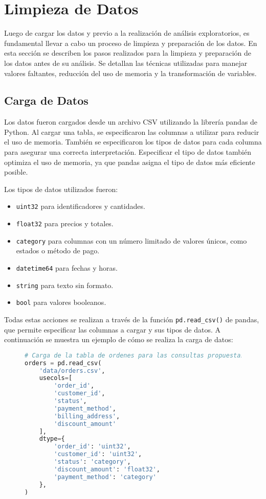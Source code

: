 \section{Limpieza de Datos}
\label{sec:limpieza_de_datos}

Luego de cargar los datos y previo a la realización de análisis exploratorios, es fundamental llevar a cabo un proceso de limpieza y preparación de los datos.
En esta sección se describen los pasos realizados para la limpieza y preparación de los datos antes de su análisis. Se detallan las técnicas utilizadas para manejar valores faltantes, reducción del uso de memoria y la transformación de variables.

\subsection{Carga de Datos}

Los datos fueron cargados desde un archivo CSV utilizando la librería pandas de Python. Al cargar una tabla, se especificaron las columnas a utilizar para reducir el uso de memoria. También se especificaron los tipos de datos para cada columna para asegurar una correcta interpretación. Especificar el tipo de datos también optimiza el uso de memoria, ya que pandas asigna el tipo de datos más eficiente posible.

Los tipos de datos utilizados fueron:
\begin{itemize}
    \item \texttt{uint32} para identificadores y cantidades.
    \item \texttt{float32} para precios y totales.
    \item \texttt{category} para columnas con un número limitado de valores únicos, como estados o método de pago.
    \item \texttt{datetime64} para fechas y horas.
    \item \texttt{string} para texto sin formato.
    \item \texttt{bool} para valores booleanos.
\end{itemize}

Todas estas acciones se realizan a través de la función \texttt{pd.read\_csv()} de pandas, que permite especificar las columnas a cargar y sus tipos de datos. A continuación se muestra un ejemplo de cómo se realiza la carga de datos:

\begin{figure}[H]
\begin{lstlisting}[language=Python, xleftmargin=70pt, xrightmargin=70pt]
# Carga de la tabla de ordenes para las consultas propuestas por el enunciado
orders = pd.read_csv(
    'data/orders.csv',
    usecols=[
        'order_id',
        'customer_id',
        'status',
        'payment_method',
        'billing_address',
        'discount_amount'
    ],
    dtype={
        'order_id': 'uint32',
        'customer_id': 'uint32',
        'status': 'category',
        'discount_amount': 'float32',
        'payment_method': 'category'
    },
)
\end{lstlisting}
\end{figure}

